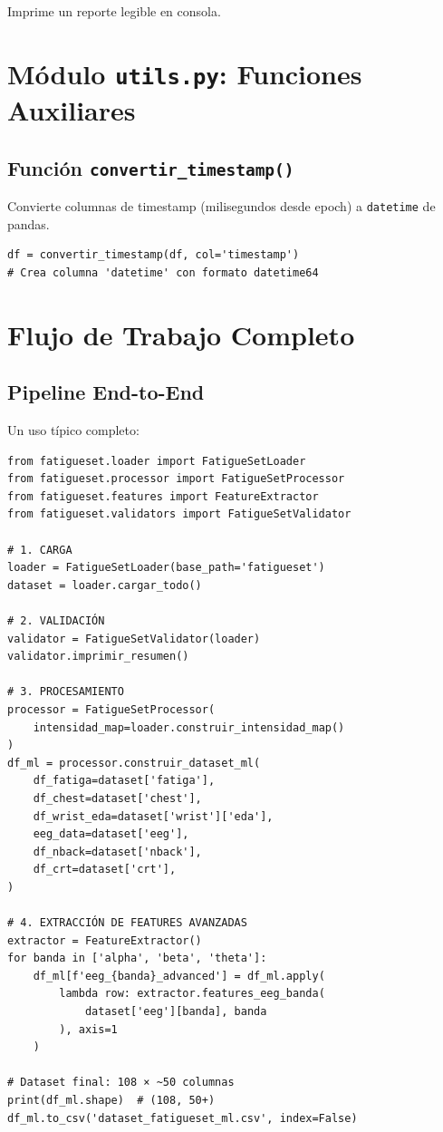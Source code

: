 \documentclass[12pt,a4paper]{article}
\begin{document}
Imprime un reporte legible en consola.

\section{Módulo \texttt{utils.py}: Funciones Auxiliares}

\subsection{Función \texttt{convertir\_timestamp()}}

Convierte columnas de timestamp (milisegundos desde epoch) a \texttt{datetime} de pandas.

\begin{lstlisting}
df = convertir_timestamp(df, col='timestamp')
# Crea columna 'datetime' con formato datetime64
\end{lstlisting}

\section{Flujo de Trabajo Completo}

\subsection{Pipeline End-to-End}

Un uso típico completo:

\begin{lstlisting}
from fatigueset.loader import FatigueSetLoader
from fatigueset.processor import FatigueSetProcessor
from fatigueset.features import FeatureExtractor
from fatigueset.validators import FatigueSetValidator

# 1. CARGA
loader = FatigueSetLoader(base_path='fatigueset')
dataset = loader.cargar_todo()

# 2. VALIDACIÓN
validator = FatigueSetValidator(loader)
validator.imprimir_resumen()

# 3. PROCESAMIENTO
processor = FatigueSetProcessor(
    intensidad_map=loader.construir_intensidad_map()
)
df_ml = processor.construir_dataset_ml(
    df_fatiga=dataset['fatiga'],
    df_chest=dataset['chest'],
    df_wrist_eda=dataset['wrist']['eda'],
    eeg_data=dataset['eeg'],
    df_nback=dataset['nback'],
    df_crt=dataset['crt'],
)

# 4. EXTRACCIÓN DE FEATURES AVANZADAS
extractor = FeatureExtractor()
for banda in ['alpha', 'beta', 'theta']:
    df_ml[f'eeg_{banda}_advanced'] = df_ml.apply(
        lambda row: extractor.features_eeg_banda(
            dataset['eeg'][banda], banda
        ), axis=1
    )

# Dataset final: 108 × ~50 columnas
print(df_ml.shape)  # (108, 50+)
df_ml.to_csv('dataset_fatigueset_ml.csv', index=False)
\end{lstlisting}
\end{document}
